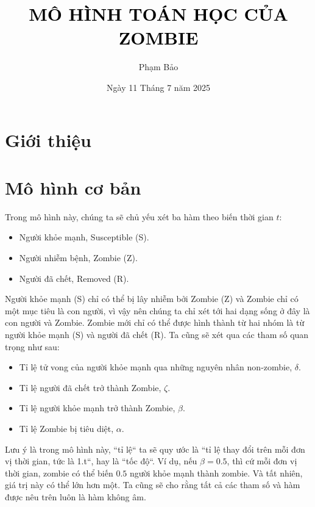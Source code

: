 \documentclass[12pt]{scrartcl}
\begin{document}
\title{\vspace{-2em}\LARGE\textcolor{black}{\textbf{MÔ HÌNH TOÁN HỌC CỦA ZOMBIE}}}
\date{\large Ngày 11 Tháng 7 năm 2025}

\author{\large Phạm Bảo}

\maketitle
\thispagestyle{empty}


\setcounter{page}{1}
\thispagestyle{plain}
\section{Giới thiệu}
\section{Mô hình cơ bản}


Trong mô hình này, chúng ta sẽ chủ yếu xét ba hàm theo biến thời gian $t$:
\begin{itemize}
    \item Người khỏe mạnh, Susceptible (S).
    \item Người nhiễm bệnh, Zombie (Z).
    \item Người đã chết, Removed (R).
\end{itemize}

Người khỏe mạnh (S) chỉ có thể bị lây nhiễm bởi Zombie (Z) và Zombie chỉ có một mục tiêu là con người, vì vậy nên chúng ta chỉ xét tới hai dạng sống ở đây là con người và Zombie. Zombie mới chỉ có thể được hình thành từ hai nhóm là từ người khỏe mạnh (S) và người đã chết (R). Ta cũng sẽ xét qua các tham số quan trọng như sau:
\begin{itemize}
    \item Tỉ lệ tử vong của người khỏe mạnh qua những nguyên nhân non-zombie, $\delta$.
    \item Tỉ lệ người đã chết trở thành Zombie, $\zeta$.
    \item Tỉ lệ người khỏe mạnh trở thành Zombie, $\beta$.
    \item Tỉ lệ Zombie bị tiêu diệt, $\alpha$.
\end{itemize}
Lưu ý là trong mô hình này, ``tỉ lệ`` ta sẽ quy ước là ``tỉ lệ thay đổi trên mỗi đơn vị thời gian, tức là 1.t``, hay là ``tốc độ``. Ví dụ, nếu $\beta = 0.5$, thì cứ mỗi đơn vị thời gian, zombie có thể biến $0.5$ người khỏe mạnh thành zombie. Và tất nhiên, giá trị này có thể lớn hơn một. Ta cũng sẽ cho rằng tất cả các tham số và hàm được nêu trên luôn là hàm không âm.
\end{document}
